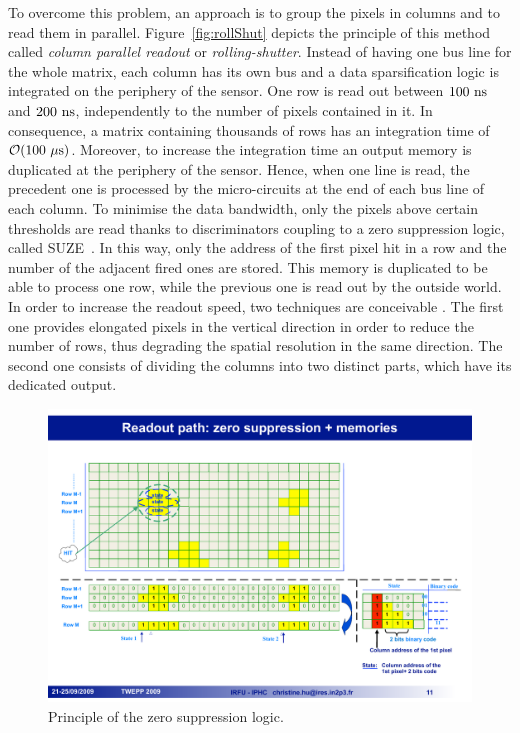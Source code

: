    To overcome this problem, an approach is to group the pixels in columns and to read them in parallel.
    Figure~\ref{fig:rollShut} depicts the principle of this method called \textit{column parallel readout} or \textit{rolling-shutter}.
    Instead of having one bus line for the whole matrix, each column has its own bus and a data sparsification logic is integrated on the periphery of the sensor.
    One row is read out between $100~\rm{ns}$ and $200~\rm{ns}$, independently to the number of pixels contained in it.
    In consequence, a matrix containing thousands of rows has an integration time of $\mathcal{O}(100~\rm{\mu s})$.
    Moreover, to increase the integration time an output memory is duplicated at the periphery of the sensor.
    Hence, when one line is read, the precedent one is processed by the micro-circuits at the end of each bus line of each column.
    To minimise the data bandwidth, only the pixels above certain thresholds are read thanks to discriminators coupling to a zero suppression logic, called \gls{SUZE}~\cite{Himmi}.
    In this way, only the address of the first pixel hit in a row and the number of the adjacent fired ones are stored.
    This memory is duplicated to be able to process one row, while the previous one is read out by the outside world.
    In order to increase the readout speed, two techniques are conceivable \cite{Winter:2009zz}.
    The first one provides elongated pixels in the vertical direction in order to reduce the number of rows, thus degrading the spatial resolution in the same direction.
    The second one consists of dividing the columns into two distinct parts, which have its dedicated output.

    \begin{figure}[!h]
      \centering
      \includegraphics[width=\textwidth]{Pictures/vxd/suze_hit.pdf}
      \caption{Principle of the zero suppression logic. }
      \label{fig:SUZE}
    \end{figure}

